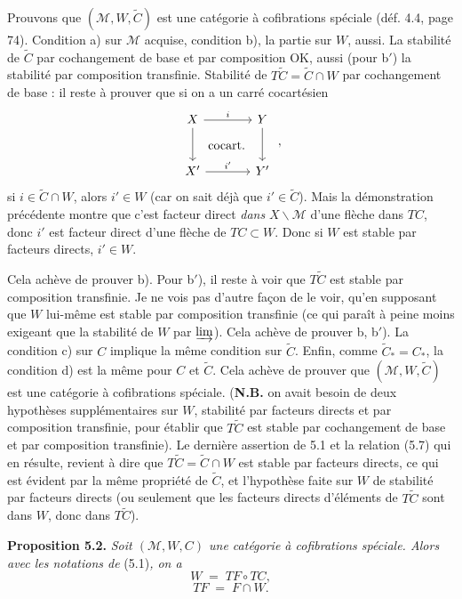 \documentclass[11pt]{article}
\newcommand{\printedpage}[1]{\marginpar{\footnotesize p.~#1}}
\newcommand{\msp}[1]{\marginpar{\footnotesize [#1]}}
\begin{document}
Prouvons que $(\mathcal{M}, W, \tilde{C})$ est une catégorie à cofibrations spéciale (déf. 4.4, page 74). Condition a) sur $\mathcal{M}$ acquise, condition b), la partie sur $W$, aussi. La stabilité de $\tilde{C}$ par cochangement de base et par composition OK, aussi (pour b$'$) la stabilité par composition transfinie. Stabilité de $T\tilde{C} = \tilde{C} \cap W$ par cochangement de base : il reste à prouver que si on a un carré cocartésien
\[
\begin{tikzcd}[row sep=large, column sep=large]
X \arrow[r, "i"] \arrow[d] \arrow[dr, phantom, "\text{cocart.}"] & Y \arrow[d] \\
X' \arrow[r, "i'"] & Y'
\end{tikzcd} \; ,
\]
si $i \in \tilde{C}\cap W$, alors $i' \in W$ (car on sait déjà que $i' \in \tilde{C}$). Mais la démonstration précédente montre que c'est facteur direct \textit{dans} $X\backslash\mathcal{M}$ d'une flèche dans $TC$, donc $i'$ est facteur direct d'une flèche de $TC \subset W$. Donc si $W$ est stable par facteurs directs, $i' \in W$.

\printedpage{43}
\msp{page 86}

Cela achève de prouver b). Pour b$'$), il reste à voir que $T\tilde{C}$ est stable par composition transfinie. Je ne vois pas d'autre façon de le voir, qu'en supposant que $W$ lui-même est stable par composition transfinie (ce qui paraît à peine moins exigeant que la stabilité de $W$ par $\varinjlim$). Cela achève de prouver b, b$'$). La condition c) sur $C$ implique la même condition sur $\tilde{C}$. Enfin, comme $\tilde{C}_{*} = C_{*}$, la condition d) est la même pour $C$ et $\tilde{C}$. Cela achève de prouver que $(\mathcal{M}, W, \tilde{C})$ est une catégorie à cofibrations spéciale. (\textbf{N.B.} on avait besoin de deux hypothèses supplémentaires sur $W$, stabilité par facteurs directs et par composition transfinie, pour établir que $T\tilde{C}$ est stable par cochangement de base et par composition transfinie). Le dernière assertion de 5.1 et la relation (5.7) qui en résulte, revient à dire que $T\tilde{C} = \tilde{C} \cap W$ est stable par facteurs directs, ce qui est évident par la même propriété de $\tilde{C}$, et l'hypothèse faite sur $W$ de stabilité par facteurs directs (ou seulement que les facteurs directs d'éléments de $T\tilde{C}$ sont dans $W$, donc dans $T\tilde{C}$). %

\msp{page 87}

\textbf{Proposition 5.2.} \textit{Soit $(\mathcal{M}, W, C)$ une catégorie à cofibrations spéciale. Alors avec les notations de} (5.1)\textit{, on a}
\[
W \;=\; TF \circ TC,
\tag*{(5.8)}
\]
\[
TF \;=\; F \cap W.
\tag*{(5.9)}
\]
\end{document}
